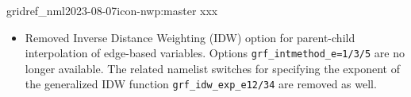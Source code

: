 \begin{changeitem}{gridref\_nml}{2023-08-07}{icon-nwp:master xxx}
  \begin{itemize}
   \item Removed Inverse Distance Weighting (IDW) option for parent-child interpolation of edge-based variables. Options \texttt{grf\_intmethod\_e=1/3/5} are no longer available. The related namelist switches for specifying the exponent of the generalized IDW function \texttt{grf\_idw\_exp\_e{12/34}} are removed as well.
  \end{itemize}
\end{changeitem}
